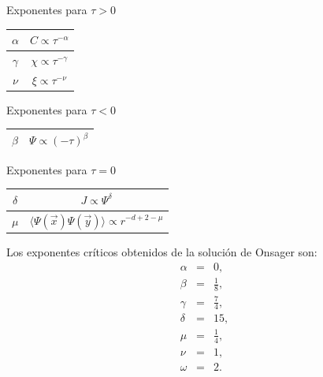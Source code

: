 \documentclass[letterpaper,12pt,oneside]{book}
\begin{document}
\begin{center}
Exponentes para $\tau > 0$\\
\begin{tabular}{ |c|c| } 
\hline
$\alpha$ & $C \propto \tau^{-\alpha}$\\
\hline
$\gamma$ & $\chi \propto \tau^{-\gamma}$\\
\hline
$\nu$ & $\xi \propto \tau^{-\nu}$\\
\hline
\end{tabular} 
\end{center}
\begin{center}
Exponentes para $\tau < 0$\\
\begin{tabular}{ |c|c| } 
\hline
$\beta$ & $\Psi \propto (-\tau)^{\beta}$\\
\hline
\end{tabular} 
\end{center} 
\begin{center}
Exponentes para $\tau = 0$\\
\begin{tabular}{ |c|c| } 
\hline
$\delta$ & $J \propto \Psi^{\delta}$\\
\hline
$\mu$ & $\langle \Psi (\vec{x}) \Psi (\vec{y}) \rangle \propto r^{-d+2-\mu}$\\
\hline
\end{tabular} 
\end{center} 

Los exponentes cr\'iticos obtenidos de la soluci\'on de Onsager \cite{Onsager} son:
%
\begin{eqnarray}
\alpha &=& 0,\\
\beta &=& \frac{1}{8},\\
\gamma &=& \frac{7}{4},\\
\delta &=& 15,\\
\mu &=& \frac{1}{4},\\
\nu &=& 1,\\
\omega &=& 2.
\end{eqnarray}
%
\end{document}
